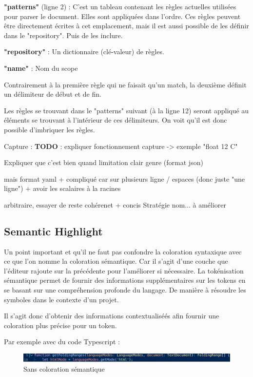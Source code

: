 \documentclass[
    iict, %
    il, %
]{heig-tb}
\begin{document}
\textbf{"patterns"} (ligne 2) : C'est un tableau contenant les règles actuelles utilisées pour parser le document. Elles sont appliquées dans l'ordre.
Ces règles peuvent être directement écrites à cet emplacement, mais il est aussi possible de les définir dans le "repository". Puis de les inclure.

\textbf{"repository"} : Un dictionnaire (clé-valeur) de règles.

\textbf{"name"} : Nom du scope

Contrairement à la première règle qui ne faisait qu'un match, la deuxième définit un délimiteur de début et de fin.

Les règles se trouvant dans le "patterns" suivant (à la ligne 12) seront appliqué au éléments se trouvant à l'intérieur de ces délimiteurs. On voit qu'il est donc possible d'imbriquer les règles.

Capture : \textbf{TODO} : expliquer fonctionnement capture -> exemple "float 12 C"

Expliquer que c'est bien quand limitation clair genre {} (format json)

mais format yaml + compliqué car sur plusieurs ligne / espaces (donc juste "une ligne")
+ avoir les scalaires à la racines

arbitraire, essayer de reste cohérenet + concis
Stratégie nom... à améliorer

\subsection{Semantic Highlight}

Un point important et qu'il ne faut pas confondre la coloration syntaxique avec ce que l'on nomme la coloration sémantique. Car il s'agit d'une couche que l'éditeur rajoute sur la précédente pour l'améliorer si nécessaire.
La tokénisation sémantique permet de fournir des informations supplémentaires sur les tokens en se basant sur une compréhension profonde du langage.
De manière à résoudre les symboles dans le contexte d'un projet.

Il s'agit donc d'obtenir des informations contextualiséés afin fournir une coloration plus précise pour un token.

Par exemple avec du code Typescript :

\begin{figure}[!h]
    \begin{center}
        \includegraphics[width=15cm]{assets/figures/semantic-coloration-without.png}
    \end{center}
    \caption[Sans coloration sémantique]{\label{semantic-coloration-without} Sans coloration sémantique}
\end{figure}
\end{document}
